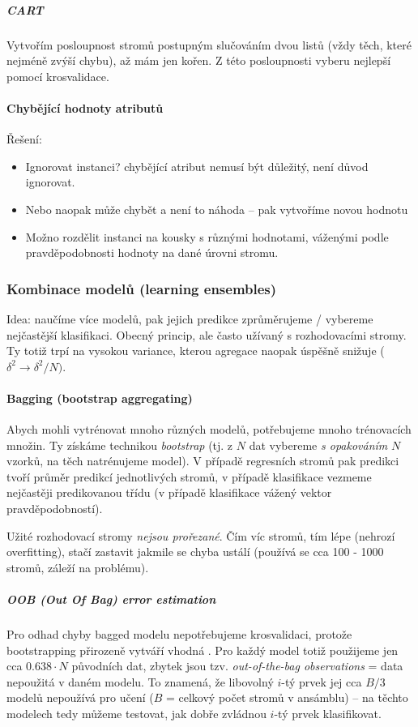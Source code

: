 \documentclass[11pt]{report} %
\numberwithin{equation}{section}
\begin{document}
\subparagraph{CART}
Vytvořím posloupnost stromů postupným slučováním dvou listů (vždy těch, které nejméně zvýší chybu), až mám jen kořen. Z této posloupnosti vyberu nejlepší pomocí krosvalidace.

\paragraph{Chybějící hodnoty atributů}
Řešení:
\begin{itemize}
\item Ignorovat instanci? chybějící atribut nemusí být důležitý, není důvod ignorovat.	
\item Nebo naopak může chybět a není to náhoda -- pak vytvoříme novou hodnotu 
\item Možno rozdělit instanci na kousky s různými hodnotami, váženými podle pravděpodobnosti hodnoty na dané úrovni stromu.
\end{itemize}


\subsubsection{Kombinace modelů (learning ensembles)}
Idea: naučíme více modelů, pak jejich predikce zprůměrujeme / vybereme nejčastější klasifikaci. Obecný princip, ale často užívaný s rozhodovacími stromy. Ty totiž trpí na vysokou variance, kterou agregace naopak úspěšně snižuje ($\delta^2 \to \delta^2 / N)$. 



\paragraph{Bagging (bootstrap aggregating)}
Abych mohli vytrénovat mnoho různých modelů, potřebujeme mnoho trénovacích množin. Ty získáme technikou \textit{bootstrap} (tj. z $N$ dat vybereme \textit{s opakováním} $N$ vzorků, na těch natrénujeme model). V případě regresních stromů pak predikci tvoří průměr predikcí jednotlivých stromů, v případě klasifikace vezmeme nejčastěji predikovanou třídu (v případě  klasifikace vážený vektor pravděpodobností).

Užité rozhodovací stromy \textit{nejsou prořezané}. Čím víc stromů, tím lépe (nehrozí overfitting), stačí zastavit jakmile se chyba ustálí (používá se cca 100 - 1000 stromů, záleží na problému).

\subparagraph{OOB (Out Of Bag) error estimation}
Pro odhad chyby bagged modelu nepotřebujeme krosvalidaci, protože bootstrapping přirozeně vytváří vhodná . Pro každý model totiž použijeme jen cca $0.638\cdot N$ původních dat, zbytek jsou tzv. \textit{out-of-the-bag observations} = data nepoužitá v daném modelu. To znamená, že libovolný $i$-tý prvek jej cca $B/3$ modelů nepoužívá pro učení ($B$ = celkový počet stromů v ansámblu) -- na těchto modelech tedy můžeme testovat, jak dobře zvládnou $i$-tý prvek klasifikovat.
\end{document}
